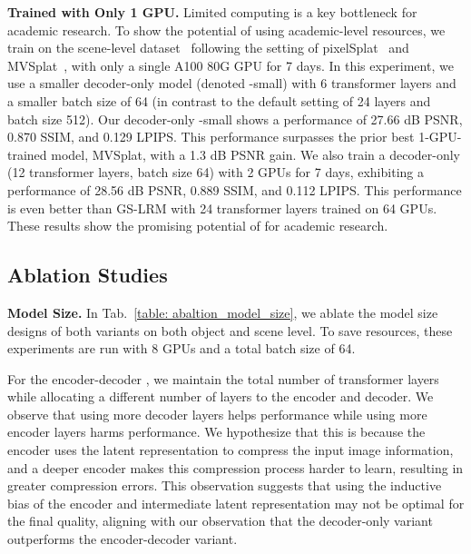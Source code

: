 \vspace{-1mm}
\textbf{\paperName{} Trained with Only 1 GPU.} 
Limited computing is a key bottleneck for academic research. 
To show the potential of \paperName{} using academic-level resources, we train \paperName{} on the scene-level dataset~\citep{realestate10k_zhou2018stereo} following the setting of pixelSplat~\citep{charatan2024pixelsplat} and MVSplat~\citep{chen2024mvsplatefficient3dgaussian}, with only a single A100 80G GPU for 7 days. 
In this experiment, we use a smaller decoder-only model (denoted \paperName-small) with 6 transformer layers and a smaller batch size of 64 (in contrast to the default setting of 24 layers and batch size 512). 
Our decoder-only \paperName-small shows a performance of 27.66 dB PSNR, 0.870 SSIM, and 0.129 LPIPS. This performance surpasses the prior best 1-GPU-trained model, MVSplat, with a 1.3 dB PSNR gain. We also train a decoder-only \paperName (12 transformer layers, batch size 64) with 2 GPUs for 7 days, exhibiting a performance of 28.56 dB PSNR, 0.889 SSIM, and 0.112 LPIPS. This performance is even better than GS-LRM with 24 transformer layers trained on 64 GPUs.
These results show the promising potential of \paperName{} for academic research.



\vspace{-2mm}
\subsection{Ablation Studies}
\label{sec: exp_ablation}
\vspace{-1mm}
\textbf{Model Size.} In Tab.~\ref{table: abaltion_model_size}, we ablate the model size designs of both \paperName{} variants on both object and scene level. To save resources, these experiments are run with 8 GPUs and a total batch size of 64. 

For the encoder-decoder \paperName{}, we maintain the total number of transformer layers while allocating a different number of layers to the encoder and decoder. 
We observe that using more decoder layers helps performance while using more encoder layers harms performance. We hypothesize that this is because the encoder uses the latent representation to compress the input image information, and a deeper encoder makes this compression process harder to learn, resulting in greater compression errors.  
This observation suggests that using the inductive bias of the encoder and intermediate latent representation may not be optimal for the final quality, aligning with our observation that the decoder-only variant outperforms the encoder-decoder variant.


